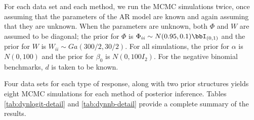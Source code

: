 \documentclass[12pt]{article}
\begin{document}
For each data set and each method, we run the MCMC simulations twice, once
assuming that the parameters of the AR model are known and again assuming that
they are unknown.  When the parameters are unknown, both $\Phi$ and $W$ are
assumed to be diagonal; the prior for $\Phi$ is $\Phi_{ii} \sim N(0.95, 0.1)
\bbI_{(0,1)}$ and the prior for $W$ is $W_{ii} \sim Ga(300/2, 30/2)$.  For all
simulations, the prior for $\alpha$ is $N(0, 100)$ and the prior for $\beta_0$
is $N(0, 100 I_2)$.  For the negative binomial benchmarks, $d$ is taken to be
known.

Four data sets for each type of response, along with two prior structures yields
eight MCMC simulations for each method of posterior inference.  Tables
\ref{tab:dynlogit-detail} and \ref{tab:dynnb-detail} provide a complete summary
of the results.

\end{document}

